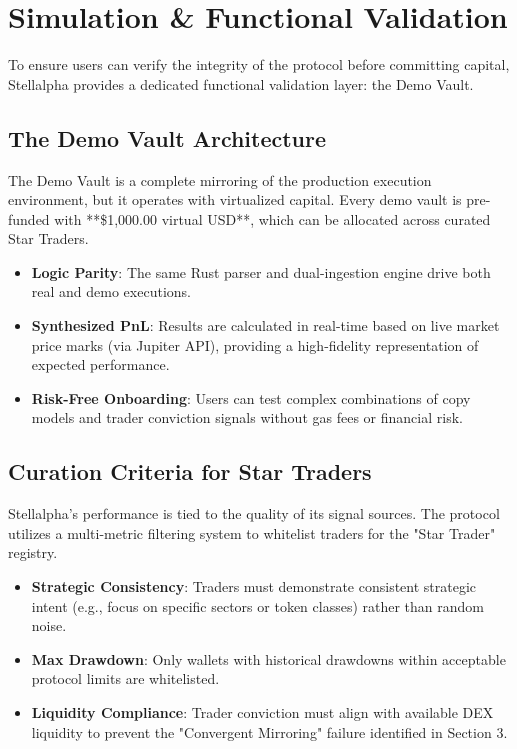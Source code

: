 \section{Simulation \& Functional Validation}

To ensure users can verify the integrity of the protocol before committing capital, Stellalpha provides a dedicated functional validation layer: the Demo Vault.

\subsection{The Demo Vault Architecture}

The Demo Vault is a complete mirroring of the production execution environment, but it operates with virtualized capital. Every demo vault is pre-funded with **\$1,000.00 virtual USD**, which can be allocated across curated Star Traders.

\begin{itemize}
  \item \textbf{Logic Parity}: The same Rust parser and dual-ingestion engine drive both real and demo executions. 
  \item \textbf{Synthesized PnL}: Results are calculated in real-time based on live market price marks (via Jupiter API), providing a high-fidelity representation of expected performance.
  \item \textbf{Risk-Free Onboarding}: Users can test complex combinations of copy models and trader conviction signals without gas fees or financial risk.
\end{itemize}

\subsection{Curation Criteria for Star Traders}

Stellalpha's performance is tied to the quality of its signal sources. The protocol utilizes a multi-metric filtering system to whitelist traders for the "Star Trader" registry.

\begin{itemize}
  \item \textbf{Strategic Consistency}: Traders must demonstrate consistent strategic intent (e.g., focus on specific sectors or token classes) rather than random noise.
  \item \textbf{Max Drawdown}: Only wallets with historical drawdowns within acceptable protocol limits are whitelisted.
  \item \textbf{Liquidity Compliance}: Trader conviction must align with available DEX liquidity to prevent the "Convergent Mirroring" failure identified in Section 3.
\end{itemize}
